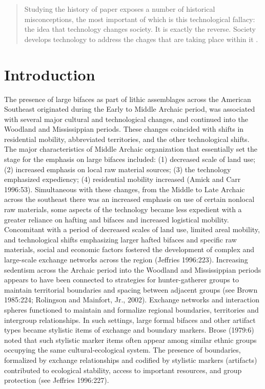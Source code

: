 \documentclass[]{interact}
\theoremstyle{plain}%
\theoremstyle{definition}
\theoremstyle{remark}
\begin{document}
\begin{quote}
Studying the history of paper exposes a number of historical
misconceptions, the most important of which is this technological
fallacy: the idea that technology changes society. It is exactly the
reverse. Society develops technology to address the chages that are
taking place within it \citep[xiv]{RN10878}.
\end{quote}

\hypertarget{introduction}{%
\section{Introduction}\label{introduction}}

The presence of large bifaces as part of lithic assemblages across the
American Southeast originated during the Early to Middle Archaic period,
was associated with several major cultural and technological changes,
and continued into the Woodland and Mississippian periods. These changes
coincided with shifts in residential mobility, abbreviated territories,
and the other technological shifts. The major characteristics of Middle
Archaic organization that essentially set the stage for the emphasis on
large bifaces included: (1) decreased scale of land use; (2) increased
emphasis on local raw material sources; (3) the technology emphasized
expediency; (4) residential mobility increased (Amick and Carr 1996:53).
Simultaneous with these changes, from the Middle to Late Archaic across
the southeast there was an increased emphasis on use of certain nonlocal
raw materials, some aspects of the technology became less expedient with
a greater reliance on hafting and bifaces and increased logistical
mobility. Concomitant with a period of decreased scales of land use,
limited areal mobility, and technological shifts emphasizing larger
hafted bifaces and specific raw materials, social and economic factors
fostered the development of complex and large-scale exchange networks
across the region (Jeffries 1996:223). Increasing sedentism across the
Archaic period into the Woodland and Mississippian periods appears to
have been connected to strategies for hunter-gatherer groups to maintain
territorial boundaries and spacing between adjacent groups (see Brown
1985:224; Rolingson and Mainfort, Jr., 2002). Exchange networks and
interaction spheres functioned to maintain and formalize regional
boundaries, territories and intergroup relationships. In such settings,
large formal bifaces and other artifact types became stylistic items of
exchange and boundary markers. Brose (1979:6) noted that such stylistic
marker items often appear among similar ethnic groups occupying the same
cultural-ecological system. The presence of boundaries, formalized by
exchange relationships and codified by stylistic markers (artifacts)
contributed to ecological stability, access to important resources, and
group protection (see Jeffries 1996:227).
\end{document}
